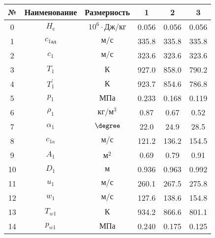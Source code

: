 \begin{center}
    \begin{longtable}{|c|c|c|c|c|c|}
        \hline
        \textbf{№} &
        \textbf{Наименование} &
        \textbf{Размерность} &
        \textbf{1} &
        \textbf{2} &
        \textbf{3} \\\hline
        \endhead
        
        0 & $H_с$ & $10^6 \cdot Дж/кг$ & 0.056 & 0.056 & 0.056 \\\hline
        
        1 & $c_{1ад}$ & $м/с$ & 335.8 & 335.8 & 335.8 \\\hline
        
        2 & $c_{1}$ & $м/с$ & 323.6 & 323.6 & 323.6 \\\hline
        
        3 & $T_1$ & $К$ & 927.0 & 858.0 & 790.2 \\\hline
        
        4 & $T_1^\prime$ & $К$ & 923.7 & 854.6 & 786.8 \\\hline
        
        5 & $p_1$ & $МПа$ & 0.233 & 0.168 & 0.119 \\\hline
        
        6 & $\rho_1$ & $кг/м^3$ & 0.87 & 0.67 & 0.52 \\\hline
        
        7 & $\alpha_1$ & $\degree$ & 22.0 & 24.9 & 28.5 \\\hline
        
        8 & $c_{1a}$ & $м/с$ & 121.2 & 136.2 & 154.5 \\\hline
        
        9 & $A_1$ & $м^2$ & 0.69 & 0.79 & 0.91 \\\hline
        
        10 & $D_1$ & $м$ & 0.936 & 0.963 & 0.992 \\\hline
        
        11 & $u_1$ & $м/с$ & 260.1 & 267.5 & 275.8 \\\hline
        
        12 & $w_1$ & $м/с$ & 127.6 & 138.6 & 154.8 \\\hline
        
        13 & $T_{w1}$ & $К$ & 934.2 & 866.6 & 801.1 \\\hline
        
        14 & $p_{w1}$ & $МПа$ & 0.240 & 0.175 & 0.125 \\\hline
        

\end{longtable}
\end{center}
